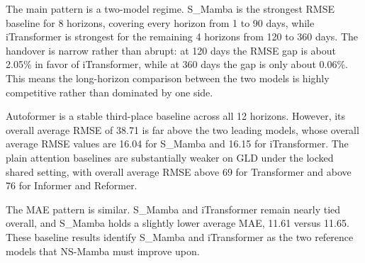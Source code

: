 The main pattern is a two-model regime.
S\_Mamba is the strongest RMSE baseline for 8 horizons, covering every horizon from 1 to 90 days, while iTransformer is strongest for the remaining 4 horizons from 120 to 360 days.
The handover is narrow rather than abrupt: at 120 days the RMSE gap is about 2.05\% in favor of iTransformer, while at 360 days the gap is only about 0.06\%.
This means the long-horizon comparison between the two models is highly competitive rather than dominated by one side.

Autoformer is a stable third-place baseline across all 12 horizons.
However, its overall average RMSE of 38.71 is far above the two leading models, whose overall average RMSE values are 16.04 for S\_Mamba and 16.15 for iTransformer.
The plain attention baselines are substantially weaker on GLD under the locked shared setting, with overall average RMSE above 69 for Transformer and above 76 for Informer and Reformer.

The MAE pattern is similar.
S\_Mamba and iTransformer remain nearly tied overall, and S\_Mamba holds a slightly lower average MAE, 11.61 versus 11.65.
These baseline results identify S\_Mamba and iTransformer as the two reference models that NS-Mamba must improve upon.
